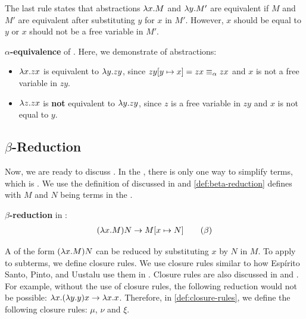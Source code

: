 The last rule states that abstractions $\lambda {x}.{M}$ and $\lambda {y}.{M'}$ are equivalent if $M$ and $M'$ are equivalent after substituting $y$ for $x$ in $M'$.
However, $x$ should be equal to $y$ or $x$ should not be a free variable in $M'$. 
\begin{example}
  \textbf{\boldmath${\alpha}$-equivalence} of \lterms. Here, we demonstrate \aeq of abstractions:
  \begin{itemize}
    \item 
    $\lambda {x}.{zx}$ is equivalent to $\lambda {y}.{zy}$, since $zy[{y}\mapsto{x}] = zx \equiv_\alpha zx$ and $x$ is not a free variable in $zy$.
    \item
    $\lambda {z}.{zx}$ is \textbf{not} equivalent to $\lambda {y}.{zy}$, since $z$ is a free variable in $zy$ and $x$ is not equal to $y$.
  \end{itemize}
\end{example}


\subsection{\texorpdfstring{\boldmath${\beta}$-Reduction}{Beta Reduction}}
Now, we are ready to discuss \br. In the \lc, there is only one way to simplify terms, which is \br. 
We use the definition of \br discussed in \cite{barendregt1992lambda} and \cref{def:beta-reduction} defines \br with $M$ and $N$ being terms in the \lc. 

\begin{definition}
  \label{def:beta-reduction}
  \textbf{\boldmath${\beta}$-reduction} in \lc:
  \begin{align*}
 (\lambda {x}.{M})N \to M [{x}\mapsto{N}] \quad \quad (\beta)
  \end{align*}
\end{definition}


A \lterm of the form $(\lambda {x}.{M})N$ can be reduced by substituting $x$ by $N$ in $M$. 
To apply \br to subterms, we define closure rules.
We use closure rules similar to how Espírito Santo, Pinto, and Uustalu use them in \cite{espritosanto_et_al:LIPIcs:2019:10525}.
Closure rules are also discussed in \cite{barendregt1992lambda} and \cite{PLOTKIN1975125}.
For example, without the use of closure rules, the following reduction would not be possible: $\lambda {x}.{(\lambda {y}.{y})x} \to \lambda {x}.{x}$.
Therefore, in \cref{def:closure-rules}, we define the following closure rules: $\mu$, $\nu$ and $\xi$.

